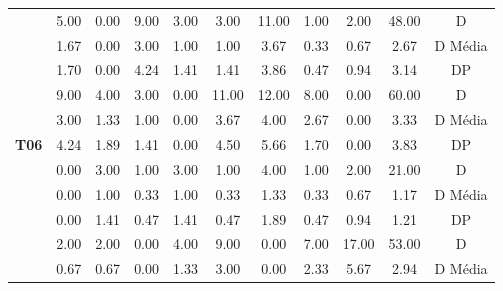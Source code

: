 \begin{table}[htbp]
\begin{tabular}{|c|c|c|c|c|c|c|c|c|cc}
		\rowcolor[HTML]{D9D9D9} 
		\cellcolor[HTML]{F2F2F2} & 5.00 & 0.00 & 9.00 & 3.00 & 3.00 & 11.00 & 1.00 & 2.00 & \multicolumn{1}{c|}{\cellcolor[HTML]{D9D9D9}48.00} & \multicolumn{1}{c|}{\cellcolor[HTML]{D9D9D9}D} \\ \cline{2-11} 
		\cellcolor[HTML]{F2F2F2} & 1.67 & 0.00 & 3.00 & 1.00 & 1.00 & 3.67 & 0.33 & 0.67 & \multicolumn{1}{c|}{2.67} & \multicolumn{1}{c|}{D Média} \\ \cline{2-11} 
		\rowcolor[HTML]{D9D9D9} 
		\multirow{-3}{*}{\cellcolor[HTML]{F2F2F2}\textbf{T05}} & 1.70 & 0.00 & 4.24 & 1.41 & 1.41 & 3.86 & 0.47 & 0.94 & \multicolumn{1}{c|}{\cellcolor[HTML]{D9D9D9}3.14} & \multicolumn{1}{c|}{\cellcolor[HTML]{D9D9D9}DP} \\ \hline
		\cellcolor[HTML]{F2F2F2} & 9.00 & 4.00 & 3.00 & 0.00 & 11.00 & 12.00 & 8.00 & 0.00 & \multicolumn{1}{c|}{60.00} & \multicolumn{1}{c|}{D} \\ \cline{2-11} 
		\rowcolor[HTML]{D9D9D9} 
		\cellcolor[HTML]{F2F2F2} & 3.00 & 1.33 & 1.00 & 0.00 & 3.67 & 4.00 & 2.67 & 0.00 & \multicolumn{1}{c|}{\cellcolor[HTML]{D9D9D9}3.33} & \multicolumn{1}{c|}{\cellcolor[HTML]{D9D9D9}D Média} \\ \cline{2-11} 
		\multirow{-3}{*}{\cellcolor[HTML]{F2F2F2}\textbf{T06}} & 4.24 & 1.89 & 1.41 & 0.00 & 4.50 & 5.66 & 1.70 & 0.00 & \multicolumn{1}{c|}{3.83} & \multicolumn{1}{c|}{DP} \\ \hline
		\rowcolor[HTML]{D9D9D9} 
		\cellcolor[HTML]{F2F2F2} & 0.00 & 3.00 & 1.00 & 3.00 & 1.00 & 4.00 & 1.00 & 2.00 & \multicolumn{1}{c|}{\cellcolor[HTML]{D9D9D9}21.00} & \multicolumn{1}{c|}{\cellcolor[HTML]{D9D9D9}D} \\ \cline{2-11} 
		\cellcolor[HTML]{F2F2F2} & 0.00 & 1.00 & 0.33 & 1.00 & 0.33 & 1.33 & 0.33 & 0.67 & \multicolumn{1}{c|}{1.17} & \multicolumn{1}{c|}{D Média} \\ \cline{2-11} 
		\rowcolor[HTML]{D9D9D9} 
		\multirow{-3}{*}{\cellcolor[HTML]{F2F2F2}\textbf{T08}} & 0.00 & 1.41 & 0.47 & 1.41 & 0.47 & 1.89 & 0.47 & 0.94 & \multicolumn{1}{c|}{\cellcolor[HTML]{D9D9D9}1.21} & \multicolumn{1}{c|}{\cellcolor[HTML]{D9D9D9}DP} \\ \hline
		\cellcolor[HTML]{F2F2F2} & 2.00 & 2.00 & 0.00 & 4.00 & 9.00 & 0.00 & 7.00 & 17.00 & \multicolumn{1}{c|}{53.00} & \multicolumn{1}{c|}{D} \\ \cline{2-11} 
		\rowcolor[HTML]{D9D9D9} 
		\cellcolor[HTML]{F2F2F2} & 0.67 & 0.67 & 0.00 & 1.33 & 3.00 & 0.00 & 2.33 & 5.67 & \multicolumn{1}{c|}{\cellcolor[HTML]{D9D9D9}2.94} & \multicolumn{1}{c|}{\cellcolor[HTML]{D9D9D9}D Média} \\ \cline{2-11} 

\end{tabular}
\end{table}
